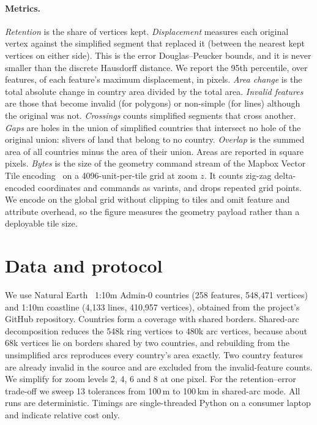 \documentclass[11pt]{article}
\begin{document}
\paragraph{Metrics.}
\emph{Retention} is the share of vertices kept. \emph{Displacement} measures
each original vertex against the simplified segment that replaced it (between
the nearest kept vertices on either side). This is the error Douglas--Peucker
bounds, and it is never smaller than the discrete Hausdorff distance. We report
the 95th percentile, over features, of each feature's maximum displacement, in
pixels. \emph{Area change} is the total absolute change in country area divided
by the total area. \emph{Invalid features} are those that become invalid (for
polygons) or non-simple (for lines) although the original was not.
\emph{Crossings} counts simplified segments that cross another. \emph{Gaps} are
holes in the union of simplified countries that intersect no hole of the
original union: slivers of land that belong to no country. \emph{Overlap} is the
summed area of all countries minus the area of their union. Areas are reported
in square pixels. \emph{Bytes} is the size of the geometry command stream of
the Mapbox Vector Tile encoding~\citep{mvt21} on a 4096-unit-per-tile grid at
zoom $z$. It counts zig-zag delta-encoded coordinates and commands as varints,
and drops repeated grid points. We encode on the global grid without clipping
to tiles and omit feature and attribute overhead, so the figure measures the
geometry payload rather than a deployable tile size.

\section{Data and protocol}
\label{sec:data}

We use Natural Earth~\citep{naturalearth} 1:10m Admin-0 countries (258
features, 548{,}471 vertices) and 1:10m coastline (4{,}133 lines, 410{,}957
vertices), obtained from the project's GitHub repository. Countries form a
coverage with shared borders. Shared-arc decomposition reduces the 548k ring
vertices to 480k arc vertices, because about 68k vertices lie on borders shared
by two countries, and rebuilding from the unsimplified arcs reproduces every
country's area exactly. Two country features are already invalid in the source
and are excluded from the invalid-feature counts. We simplify for zoom levels
2, 4, 6 and 8 at one pixel. For the retention--error trade-off we sweep 13
tolerances from 100\,m to 100\,km in shared-arc mode. All runs are
deterministic. Timings are single-threaded Python on a consumer laptop and
indicate relative cost only.
\end{document}
